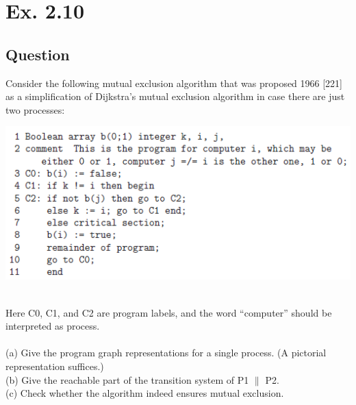 \documentclass[12pt]{article}
\begin{document}
\newpage
\section*{Ex. 2.10}
\subsection*{Question}
Consider the following mutual exclusion algorithm that was proposed 1966 [221]
as a simplification of Dijkstra’s mutual exclusion algorithm in case there are just two processes:\\
\begin{centering}
	\includegraphics*[scale=0.8]{ex210.png}
\end{centering}\\
Here C0, C1, and C2 are program labels, and the word “computer” should be interpreted as process.\\
\\
(a) Give the program graph representations for a single process. (A pictorial representation
suffices.)\\
(b) Give the reachable part of the transition system of P1 $\|$ P2.\\
(c) Check whether the algorithm indeed ensures mutual exclusion.
\end{document}
